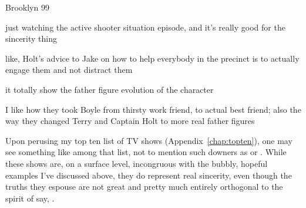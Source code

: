\documentclass[../butidigress.tex]{subfiles}
\begin{document}

\begin{somenotes}{Brooklyn 99}
    \item just watching the active shooter situation episode, and it's really good for the sincerity thing
    \item like, Holt's advice to Jake on how to help everybody in the precinct is to actually engage them and not distract them
    \item it totally show the father figure evolution of the character
    \item I like how they took Boyle from thirsty work friend, to actual best friend; also the way they changed Terry and Captain Holt to more real father figures
\end{somenotes}


Upon perusing my top ten list of TV shows (Appendix~\ref{chap:topten}), one may see something like  among that list, not to mention such downers as  or .
While these shows are, on a surface level, incongruous with the bubbly, hopeful examples I've discussed above, they do represent real sincerity, even though the truths they espouse are not great and pretty much entirely orthogonal to the spirit of say, .
\end{document}
